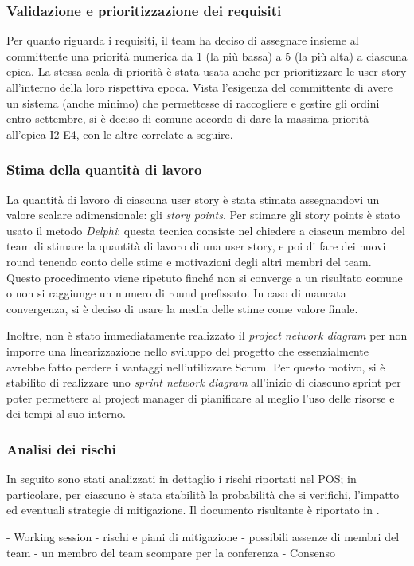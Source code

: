 \subsubsection{Validazione e prioritizzazione dei requisiti}
Per quanto riguarda i requisiti, il team ha deciso di assegnare insieme al committente una priorità numerica da 1 (la più bassa) a 5 (la più alta) a ciascuna epica.
La stessa scala di priorità è stata usata anche per prioritizzare le user story all'interno della loro rispettiva epoca.
Vista l'esigenza del committente di avere un sistema (anche minimo) che permettesse di raccogliere e gestire gli ordini entro settembre, si è deciso di comune accordo di dare la massima priorità all'epica \href{user-story:i2-e4}{I2-E4}, con le altre correlate a seguire.

\subsubsection{Stima della quantità di lavoro}
La quantità di lavoro di ciascuna user story è stata stimata assegnandovi un valore scalare adimensionale: gli \emph{story points}.
Per stimare gli story points è stato usato il metodo \emph{Delphi}: questa tecnica consiste nel chiedere a ciascun membro del team di stimare la quantità di lavoro di una user story, e poi di fare dei nuovi round tenendo conto delle stime e motivazioni degli altri membri del team. Questo procedimento viene ripetuto finché non si converge a un risultato comune o non si raggiunge un numero di round prefissato.
In caso di mancata convergenza, si è deciso di usare la media delle stime come valore finale.

Inoltre, non è stato immediatamente realizzato il \emph{project network diagram} per non imporre una linearizzazione nello sviluppo del progetto che essenzialmente avrebbe fatto perdere i vantaggi nell'utilizzare Scrum. Per questo motivo, si è stabilito di realizzare uno \emph{sprint network diagram} all'inizio di ciascuno sprint per poter permettere al project manager di pianificare al meglio l'uso delle risorse e dei tempi al suo interno.

\subsubsection{Analisi dei rischi}
In seguito sono stati analizzati in dettaglio i rischi riportati nel POS; in particolare, per ciascuno è stata stabilità la probabilità che si verifichi, l'impatto ed eventuali strategie di mitigazione. Il documento risultante è riportato in .

- Working session
  - rischi e piani di mitigazione 
    - possibili assenze di membri del team
    - un membro del team scompare per la conferenza
  - Consenso

